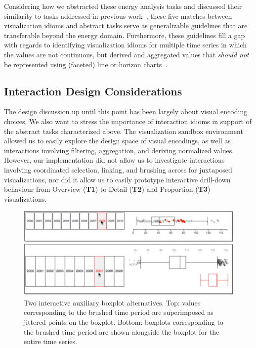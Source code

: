 \documentclass[journal]{vgtc}                %
\begin{document}
Considering how we abstracted these energy analysis tasks and discussed their similarity to tasks addressed in previous work~\cite{Albers2014,Javed2010}, these five matches between visualization idioms and abstract tasks serve as generalizable guidelines that are transferable beyond the energy domain.
Furthermore, these guidelines fill a gap with regards to identifying visualization idioms for multiple time series in which the values are not continuous, but derived and aggregated values that {\it should not} be represented using (faceted) line or horizon charts~\cite{Heer2009}.


\subsection{Interaction Design Considerations}
\label{design-interaction}


The design discussion up until this point has been largely about visual encoding choices. 
We also want to stress the importance of interaction idioms in support of the abstract tasks characterized above.
The visualization sandbox environment allowed us to easily explore the design space of visual encodings, as well as interactions involving filtering, aggregation, and deriving normalized values.
However, our implementation did not allow us to investigate interactions involving coordinated selection, linking, and brushing across for juxtaposed visualizations, nor did it allow us to easily prototype interactive drill-down behaviour from Overview ({\bf T1}) to Detail ({\bf T2}) and Proportion ({\bf T3}) visualizations.

\begin{figure}[ht]
    \vspace{-0.3cm}
	\centering
	\includegraphics[width=\columnwidth]{figures/d3-boxplots.pdf}
	\vspace{-0.6cm}
	\caption{Two interactive auxiliary boxplot alternatives. Top: values corresponding to the brushed time period are superimposed as jittered points on the boxplot. Bottom: boxplots corresponding to the brushed time period are shown alongside the boxplot for the entire time series.}
	\label{fig:interactive-boxplots}
	\vspace{-0.3cm}
\end{figure}
\end{document}
